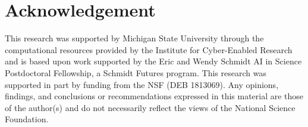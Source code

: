 \section*{Acknowledgement}

This research was supported by Michigan State University through the computational resources provided by the Institute for Cyber-Enabled Research and is based upon work supported by the Eric and Wendy Schmidt AI in Science Postdoctoral Fellowship, a Schmidt Futures program.
This research was supported in part by funding from the NSF (DEB 1813069).
Any opinions, findings, and conclusions or recommendations expressed in this material are those of the author(s) and do not necessarily reflect the views of the National Science Foundation.
